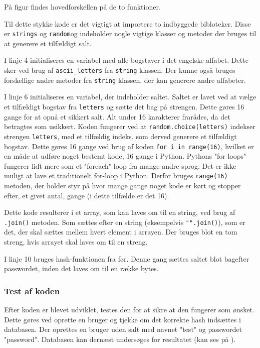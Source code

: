 \documentclass[12pt]{article}
\begin{document}
På figur \figureautorefname{~\ref{code:create-user-w-salt}} findes hovedforskellen på de to funktioner. 

Til dette stykke kode er det vigtigt at importere to indbyggede bibloteker. Disse er \verb|strings| og \verb|random|\footnotemark[7] og indeholder nogle vigtige klasser og metoder der bruges til at generere et tilfældigt salt. 


I linje 4 initialiseres en variabel med alle bogstaver i det engelske alfabet. Dette sker ved brug af \verb|ascii_letters| fra \verb|string| klassen. Der kunne også bruges forskellige andre metoder fra \verb|string| klassen, der kan generere andre alfabeter. 

I linje 6 initialiseres en variabel, der indeholder saltet. Saltet er lavet ved at vælge et tilfældigt bogstav fra \verb|letters| og sætte det bag på strengen. Dette gøres 16 gange for at opnå et sikkert salt. Alt under 16 karakterer frarådes, da det betragtes som usikkert\cite{turan_recommendation_2010}. Koden fungerer ved at \verb|random.choice(letters)| indekser strengen \verb|letters|, med et tilfældig indeks, som derved generere et tilfældigt bogstav. 
Dette gøres 16 gange ved brug af koden \verb|for i in range(16)|, hvilket er en måde at udføre noget bestemt kode, 16 gange i Python. Pythons "for loops" fungerer lidt mere som et "foreach" loop fra mange andre sprog. Det er ikke muligt at lave et traditionelt for-loop i Python. Derfor bruges \verb|range(16)| metoden, der holder styr på hvor mange gange noget kode er kørt og stopper efter, et givet antal, gange (i dette tilfælde er det 16). 

Dette kode resulterer i et array, som kan laves om til en string, ved brug af \verb|.join()| metoden. Som sættes efter en string (eksempelvis \verb|"".join()|), som er det, der skal sættes mellem hvert element i arrayen. Der bruges blot en tom streng, hvis arrayet skal laves om til en streng.

I linje 10 bruges hash-funktionen fra før. Denne gang sættes saltet blot bagefter passwordet, inden det laves om til en række bytes. 

\subsubsection{Test af koden}
Efter koden er blevet udviklet, testes den for at sikre at den fungerer som ønsket. Dette gøres ved oprette en bruger og tjekke om det korrekte hash indsættes i databasen. Der oprettes en bruger uden salt med navnet "test" og passwordet "password". Databasen kan dernæst undersøges for resultatet (kan ses på \figureautorefname{~\ref{fig:no-salt}}). 
\end{document}
